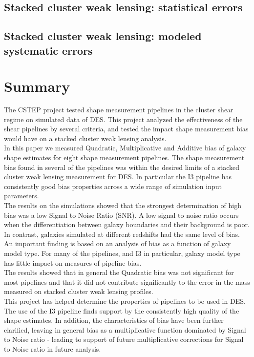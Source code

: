 \documentclass[useAMS,usenatbib]{mn2e}
\begin{document}
\subsection{Stacked cluster weak lensing: statistical errors}\label{sec:p1}


\subsection{Stacked cluster weak lensing: modeled systematic errors}\label{sec:p2}


\section{Summary}
The CSTEP project tested shape measurement pipelines in the cluster
shear regime on simulated data of DES. This project
analyzed the effectiveness of the shear pipelines by several criteria,
and tested the impact shape measurement bias would have on a stacked
cluster weak lensing analysis. \\

In this paper we measured Quadratic, Multiplicative and
Additive bias of galaxy shape estimates for eight shape measurement
pipelines. The shape measurement bias found in several of the pipelines was within the
desired limits of a stacked cluster weak lensing measurement for
DES. In particular the I3 pipeline has consistently good bias properties
across a wide range of simulation input parameters.\\

The results on the simulations showed that the strongest
determination of high bias was a low Signal to Noise Ratio (SNR). A
low signal to noise ratio occurs when the differentiation between
galaxy boundaries and their background is poor. In contrast, galaxies 
simulated at different redshifts had the same level of bias. An
important finding is based on an analysis of bias as a function of galaxy model
type. For many of the pipelines, and I3 in particular, galaxy
model type has little impact on measures of pipeline bias. \\

The results showed that in general the Quadratic bias was not
significant for most pipelines and that it did not contribute
significantly to the error in the mass measured on stacked cluster
weak lensing profiles. \\

This project has helped determine the properties of pipelines
to be used in DES. The use of the I3 pipeline
finds support by the consistently high quality of the shape
estimates. In addition, the characteristics of bias have been further
clarified, leaving in general bias as a multiplicative function
dominated by Signal to Noise ratio - leading to support of future
multiplicative corrections for Signal to Noise ratio in future
analysis. \\
\end{document}
